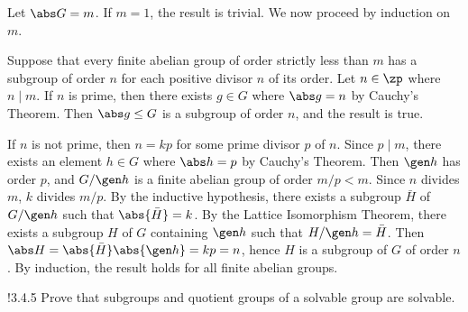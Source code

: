 \begin{sol}
    Let $\abs G = m$.
	If $m = 1$, the result is trivial.
	We now proceed by induction on $m$.

    Suppose that every finite abelian group of order strictly less than $m$ has a subgroup of order $n$ for each positive divisor $n$ of its order.
	Let $n \in \zp$ where $n \mid m$.
	If $n$ is prime, then there exists $g \in G$ where $\abs g = n$ by Cauchy's Theorem.
	Then $\abs g \leq G$ is a subgroup of order $n$, and the result is true. 
    
    If $n$ is not prime, then $n = kp$ for some prime divisor $p$ of $n$.
	Since $p \mid m$, there exists an element $h \in G$ where $\abs h = p$ by Cauchy's Theorem.
	Then $\gen h$ has order $p$, and $G/\gen h$ is a finite abelian group of order $m/p < m$.
	Since $n$ divides $m$, $k$ divides $m/p$.
	By the inductive hypothesis, there exists a subgroup $\bar H$ of $G/\gen h$ such that $\abs{\bar H} = k$.
	By the Lattice Isomorphism Theorem, there exists a subgroup $H$ of $G$ containing $\gen h$ such that $H/\gen h = \bar H$.
	Then $\abs H = \abs{\bar H} \abs{\gen h} = kp = n$, hence $H$ is a subgroup of $G$ of order $n$.
	By induction, the result holds for all finite abelian groups.
\end{sol}

\begin{exercise}!{3.4.5}
    Prove that subgroups and quotient groups of a solvable group are solvable.
\end{exercise}

